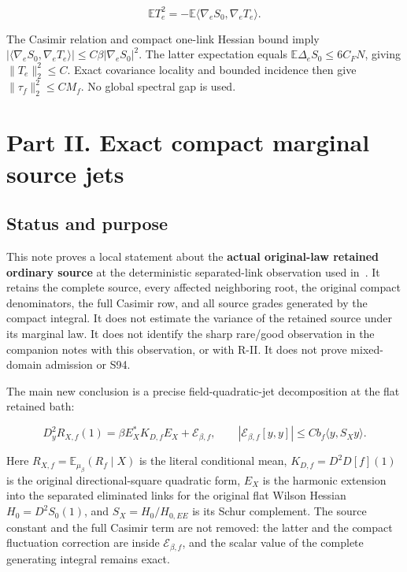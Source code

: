 \documentclass[
  11pt,
]{article}
\begin{document}
\[
 \mathbb ET_e^2=-\mathbb E\langle\nabla_eS_0,\nabla_eT_e\rangle.
\]

The Casimir relation and compact one-link Hessian bound imply
\(|\langle\nabla_eS_0,\nabla_eT_e\rangle|\le C\beta|\nabla_eS_0|^2\).
The latter expectation equals \(\mathbb E\Delta_eS_0\le6C_FN\), giving
\(\|T_e\|_2^2\le C\). Exact covariance locality and bounded incidence
then give \(\|\tau_f\|_2^2\le CM_f\). No global spectral gap is used.

\newpage

\hypertarget{part-ii.-exact-compact-marginal-source-jets}{%
\section{Part II. Exact compact marginal source
jets}\label{part-ii.-exact-compact-marginal-source-jets}}

\hypertarget{status-and-purpose}{%
\subsection{Status and purpose}\label{status-and-purpose}}

This note proves a local statement about the \textbf{actual original-law
retained ordinary source} at the deterministic separated-link
observation used in~\cite{CT}. It retains the complete source, every
affected neighboring root, the original compact denominators, the full
Casimir row, and all source grades generated by the compact integral. It
does not estimate the variance of the retained source under its marginal
law. It does not identify the sharp rare/good observation in the
companion notes with this observation, or with R-II. It does not
prove mixed-domain admission or S94.

The main new conclusion is a precise field-quadratic-jet decomposition
at the flat retained bath:

\[
 D_y^2 R_{X,f}(1)
 =\beta E_X^* K_{D,f} E_X+\mathcal E_{\beta,f},
 \qquad
 |\mathcal E_{\beta,f}[y,y]|
 \le C b_f\langle y,S_Xy\rangle.                 \tag{1}
\]

Here \(R_{X,f}=\mathbb E_{\mu_\beta}(R_f\mid X)\) is the literal
conditional mean, \(K_{D,f}=D^2D[f](1)\) is the original
directional-square quadratic form, \(E_X\) is the harmonic extension
into the separated eliminated links for the original flat Wilson Hessian
\(H_0=D^2S_0(1)\), and \(S_X=H_0/H_{0,EE}\) is its Schur complement. The
source constant and the full Casimir term are not removed: the latter
and the compact fluctuation correction are inside
\(\mathcal E_{\beta,f}\), and the scalar value of the complete
generating integral remains exact.
\end{document}
